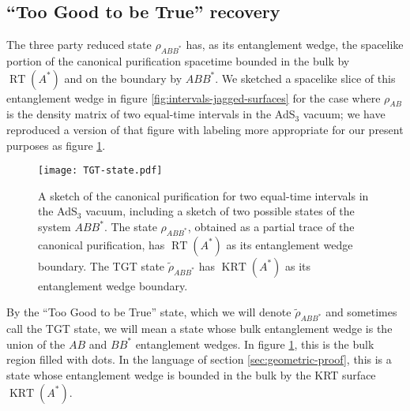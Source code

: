 \documentclass[a4paper,11pt]{article}
\renewcommand{\tilde}{\widetilde}
\newcommand{\RT}{\operatorname{RT}}
\newcommand{\KRT}{\operatorname{KRT}}
\begin{document}
\subsection{``Too Good to be True'' recovery}
\label{subsec:tgt-recovery}

The three party reduced state $\rho_{ABB^*}$ has, as its entanglement wedge, the spacelike portion of the canonical purification spacetime bounded in the bulk by $\RT(A^*)$ and on the boundary by $ABB^*$. We sketched a spacelike slice of this entanglement wedge in figure \ref{fig:intervals-jagged-surfaces} for the case where $\rho_{AB}$ is the density matrix of two equal-time intervals in the AdS$_3$ vacuum; we have reproduced a version of that figure with labeling more appropriate for our present purposes as figure \ref{fig:TGT-state}.

\begin{figure}
    \centering
    \texttt{[image: TGT-state.pdf]}
    \caption{A sketch of the canonical purification for two equal-time intervals in the AdS$_3$ vacuum, including a sketch of two possible states of the system $ABB^*.$ The state $\rho_{ABB^*}$, obtained as a partial trace of the canonical purification, has $\RT(A^*)$ as its entanglement wedge boundary. The TGT state $\tilde{\rho}_{ABB^*}$ has $\KRT(A^*)$ as its entanglement wedge boundary.}
    \label{fig:TGT-state}
\end{figure}

By the ``Too Good to be True'' state, which we will denote $\tilde{\rho}_{ABB^*}$ and sometimes call the TGT state, we will mean a state whose bulk entanglement wedge is the union of the $A B$ and $B B^*$ entanglement wedges. In figure \ref{fig:TGT-state}, this is the bulk region filled with dots. In the language of section \ref{sec:geometric-proof}, this is a state whose entanglement wedge is bounded in the bulk by the KRT surface $\KRT(A^*).$
\end{document}
